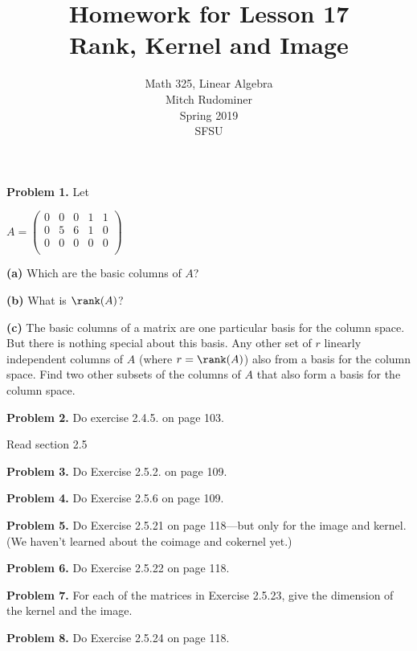 \documentclass[oneside,12pt]{amsart}
\begin{document}
\title{Homework for Lesson 17 \\ Rank, Kernel and Image}
\author{Math 325, Linear Algebra \\ Mitch Rudominer \\ Spring 2019 \\ SFSU }
\date{}

\maketitle

\bigskip

\textbf{Problem 1.} Let

$
A =
\begin{pmatrix}
0 & 0 & 0  & 1  & 1\\
0 & 5 & 6  & 1  & 0\\
0 & 0 & 0  & 0  & 0\\
\end{pmatrix}
$

\medskip

\textbf{(a)} Which are the basic columns of $A$?

\bigskip


\textbf{(b)} What is $\rank(A)$?

\bigskip


\textbf{(c)} The basic columns of a matrix are one particular basis for
the column space. But there is nothing special about this basis.  Any other
set of $r$ linearly independent columns of $A$ (where $r=\rank(A)$) also from
a basis for the column space. Find
two other subsets of the columns of $A$ that also form a basis for the column
space.

\bigskip

\textbf{Problem 2.} Do exercise 2.4.5. on page 103.

\bigskip

Read section 2.5

\bigskip

\textbf{Problem 3.} Do Exercise 2.5.2. on page 109.

\bigskip

\textbf{Problem 4.} Do Exercise 2.5.6 on page 109.

\bigskip

\textbf{Problem 5.} Do  Exercise 2.5.21 on page 118---but only for the image and kernel.
(We haven't learned about the coimage and cokernel yet.)

\bigskip

\textbf{Problem 6.} Do Exercise 2.5.22 on page 118.

\bigskip

\textbf{Problem 7.} For each of the matrices in Exercise 2.5.23, give the
dimension of the kernel and the image.

\bigskip

\textbf{Problem 8.} Do  Exercise 2.5.24 on page 118.
\end{document}
